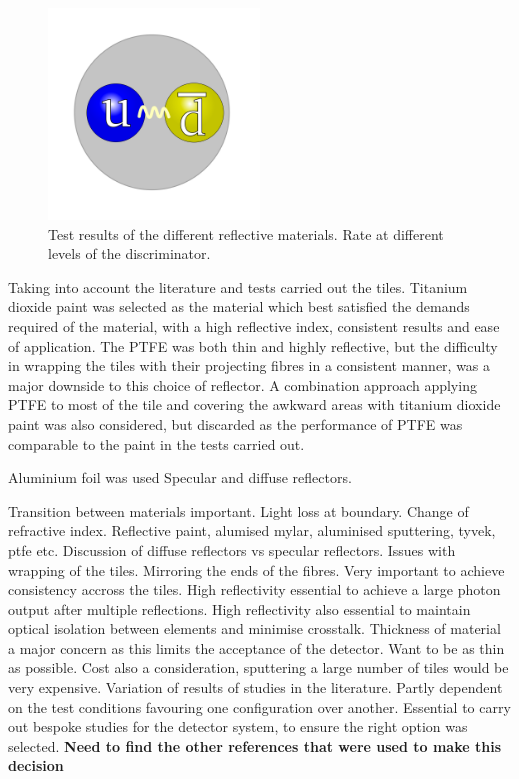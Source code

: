 \begin{figure}[!ht]
	\centering
	\includegraphics[width=0.5\textwidth]{ImgChap1/Meson2}
	\caption{Test results of the different reflective materials. Rate at different levels of the discriminator.}
	\label{ReflTestResults}
\end{figure}

Taking into account the literature and tests carried out the tiles. Titanium dioxide paint was selected as the material which best satisfied the demands required of the material, with a high reflective index, consistent results and ease of application. The PTFE was both thin and highly reflective, but the difficulty in wrapping the tiles with their projecting fibres in a consistent manner, was a major downside to this choice of reflector. A combination approach applying PTFE to most of the tile and covering the awkward areas with titanium dioxide paint was also considered, but discarded as the performance of PTFE was comparable to the paint in the tests carried out.

Aluminium foil was used 
Specular and diffuse reflectors.


Transition between materials important. Light loss at boundary. Change of refractive index.
Reflective paint, alumised mylar, aluminised sputtering, tyvek, ptfe etc.
Discussion of diffuse reflectors vs specular reflectors.
Issues with wrapping of the tiles.
Mirroring the ends of the fibres.
Very important to achieve consistency accross the tiles.
High reflectivity essential to achieve a large photon output after multiple reflections.
High reflectivity also essential to maintain optical isolation between elements and minimise crosstalk.
Thickness of material a major concern as this limits the acceptance of the detector. Want to be as thin as possible.
Cost also a consideration, sputtering a large number of tiles would be very expensive.
Variation of results of studies in the literature. Partly dependent on the test conditions favouring one configuration over another. Essential to carry out bespoke studies for the detector system, to ensure the right option was selected.
\cite{janecek2012reflectivity}
\cite{janecek2008optical}
\cite{weidner1981reflection}
\textbf{Need to find the other references that were used to make this decision}
